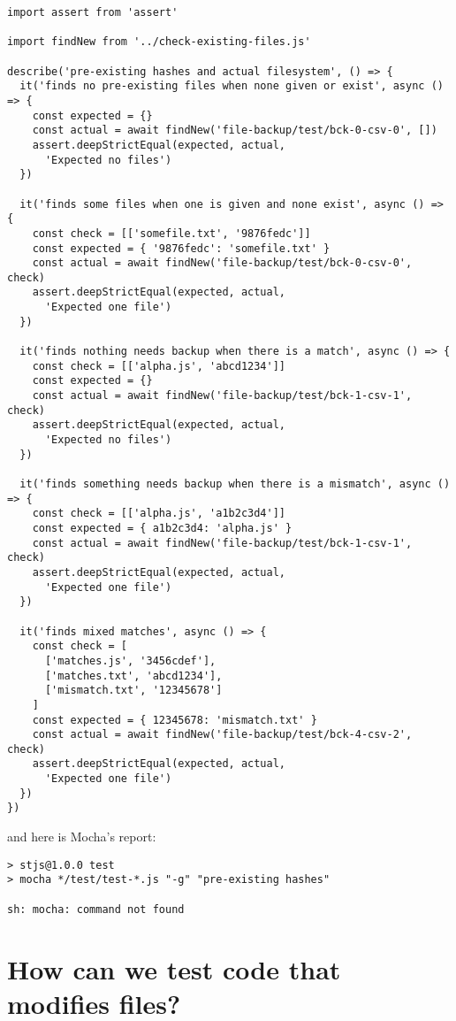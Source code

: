 \documentclass[krantzl]{krantz}
\begin{document}
\begin{lstlisting}[frame=single,frameround=tttt]
import assert from 'assert'

import findNew from '../check-existing-files.js'

describe('pre-existing hashes and actual filesystem', () => {
  it('finds no pre-existing files when none given or exist', async () => {
    const expected = {}
    const actual = await findNew('file-backup/test/bck-0-csv-0', [])
    assert.deepStrictEqual(expected, actual,
      'Expected no files')
  })

  it('finds some files when one is given and none exist', async () => {
    const check = [['somefile.txt', '9876fedc']]
    const expected = { '9876fedc': 'somefile.txt' }
    const actual = await findNew('file-backup/test/bck-0-csv-0', check)
    assert.deepStrictEqual(expected, actual,
      'Expected one file')
  })

  it('finds nothing needs backup when there is a match', async () => {
    const check = [['alpha.js', 'abcd1234']]
    const expected = {}
    const actual = await findNew('file-backup/test/bck-1-csv-1', check)
    assert.deepStrictEqual(expected, actual,
      'Expected no files')
  })

  it('finds something needs backup when there is a mismatch', async () => {
    const check = [['alpha.js', 'a1b2c3d4']]
    const expected = { a1b2c3d4: 'alpha.js' }
    const actual = await findNew('file-backup/test/bck-1-csv-1', check)
    assert.deepStrictEqual(expected, actual,
      'Expected one file')
  })

  it('finds mixed matches', async () => {
    const check = [
      ['matches.js', '3456cdef'],
      ['matches.txt', 'abcd1234'],
      ['mismatch.txt', '12345678']
    ]
    const expected = { 12345678: 'mismatch.txt' }
    const actual = await findNew('file-backup/test/bck-4-csv-2', check)
    assert.deepStrictEqual(expected, actual,
      'Expected one file')
  })
})
\end{lstlisting}



\noindent and here is Mocha's report:


\begin{lstlisting}[frame=single,frameround=tttt]
> stjs@1.0.0 test
> mocha */test/test-*.js "-g" "pre-existing hashes"

sh: mocha: command not found
\end{lstlisting}


\section{How can we test code that modifies files?}\label{file-backup-test}
\end{document}
